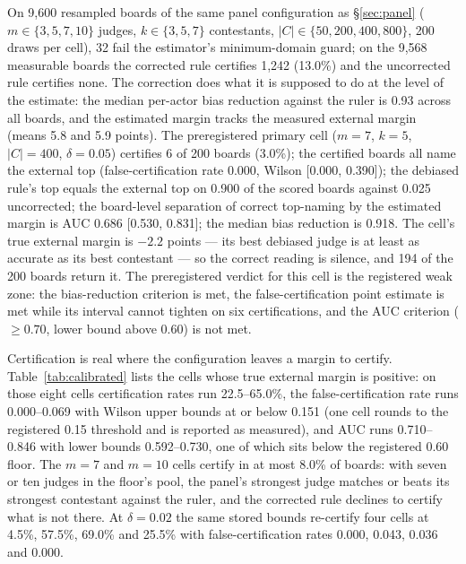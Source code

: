 \documentclass{article}
\begin{document}
On 9,600 resampled boards of the same panel configuration as \S\ref{sec:panel}
($m \in \{3,5,7,10\}$ judges, $k \in \{3,5,7\}$ contestants, $|C| \in
\{50, 200, 400, 800\}$, 200 draws per cell), 32 fail the estimator's minimum-domain
guard; on the 9,568 measurable boards the corrected rule certifies 1,242 (13.0\%)
and the uncorrected rule certifies none. The correction does what it is supposed to
do at the level of the estimate: the median per-actor bias reduction against the
ruler is 0.93 across all boards, and the estimated margin tracks the measured
external margin (means 5.8 and 5.9 points). The preregistered primary cell
($m=7$, $k=5$, $|C|=400$, $\delta=0.05$) certifies 6 of 200 boards (3.0\%); the
certified boards all name the external top (false-certification rate 0.000, Wilson
[0.000, 0.390]); the debiased rule's top equals the external top on 0.900 of the
scored boards against 0.025 uncorrected; the board-level separation of correct
top-naming by the estimated margin is AUC 0.686 [0.530, 0.831]; the median bias
reduction is 0.918. The cell's true external margin is $-2.2$ points --- its best
debiased judge is at least as accurate as its best contestant --- so the correct
reading is silence, and 194 of the 200 boards return it. The preregistered verdict
for this cell is the registered weak zone: the bias-reduction criterion is met, the
false-certification point estimate is met while its interval cannot tighten on six
certifications, and the AUC criterion ($\ge 0.70$, lower bound above 0.60) is not
met.

Certification is real where the configuration leaves a margin to certify.
Table~\ref{tab:calibrated} lists the cells whose true external margin is positive:
on those eight cells certification rates run 22.5--65.0\%, the false-certification
rate runs 0.000--0.069 with Wilson upper bounds at or below 0.151 (one cell rounds
to the registered 0.15 threshold and is reported as measured), and AUC runs
0.710--0.846 with lower bounds 0.592--0.730, one of which sits below the registered
0.60 floor. The $m=7$ and $m=10$ cells certify in at most 8.0\% of boards: with
seven or ten judges in the floor's pool, the panel's strongest judge matches or
beats its strongest contestant against the ruler, and the corrected rule declines
to certify what is not there. At $\delta=0.02$ the same stored bounds re-certify
four cells at 4.5\%, 57.5\%, 69.0\% and 25.5\% with false-certification rates
0.000, 0.043, 0.036 and 0.000.
\end{document}
